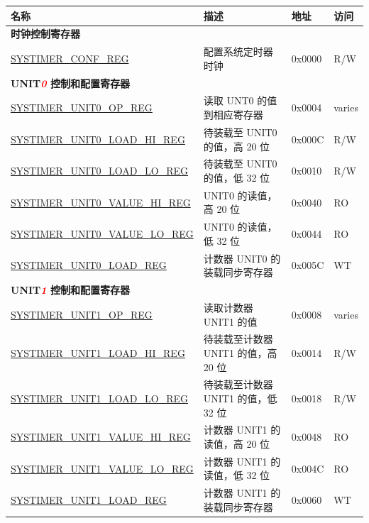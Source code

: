 \begin{longtable}{ | p{6cm} | p{7.2cm} | p{1.3cm} | p{1cm} | }
\hline\rowcolor{lightgray}
名称 & 描述 & 地址 & 访问 \\ \hline
\endhead
\multicolumn{4}{|l|}{\textbf{时钟控制寄存器}} \\ \hline
\hyperref[regdesc:SYSTIMERCONFREG]{SYSTIMER\_CONF\_REG} & 配置系统定时器时钟 & 0x0000 & R/W \\ \hline
\multicolumn{4}{|l|}{\textbf{UNIT\textcolor{red}{\it{0}} 控制和配置寄存器}} \\ \hline
\hyperref[regdesc:SYSTIMERUNIT0OPREG]{SYSTIMER\_UNIT0\_OP\_REG} & 读取 UNT0 的值到相应寄存器 & 0x0004 & varies \\ \hline
\hyperref[regdesc:SYSTIMERUNIT0LOADHIREG]{SYSTIMER\_UNIT0\_LOAD\_HI\_REG} & 待装载至 UNIT0 的值，高 20 位 & 0x000C & R/W \\ \hline
\hyperref[regdesc:SYSTIMERUNIT0LOADLOREG]{SYSTIMER\_UNIT0\_LOAD\_LO\_REG} & 待装载至 UNIT0 的值，低 32 位 & 0x0010 & R/W \\ \hline
\hyperref[regdesc:SYSTIMERUNIT0VALUEHIREG]{SYSTIMER\_UNIT0\_VALUE\_HI\_REG} & UNIT0 的读值，高 20 位 & 0x0040 & RO \\ \hline
\hyperref[regdesc:SYSTIMERUNIT0VALUELOREG]{SYSTIMER\_UNIT0\_VALUE\_LO\_REG} & UNIT0 的读值，低 32 位 & 0x0044 & RO \\ \hline
\hyperref[regdesc:SYSTIMERUNIT0LOADREG]{SYSTIMER\_UNIT0\_LOAD\_REG} & 计数器 UNIT0 的装载同步寄存器 & 0x005C & WT \\ \hline
\multicolumn{4}{|l|}{\textbf{UNIT\textcolor{red}{\it{1}} 控制和配置寄存器}} \\ \hline
\hyperref[regdesc:SYSTIMERUNIT1OPREG]{SYSTIMER\_UNIT1\_OP\_REG} & 读取计数器 UNIT1 的值 & 0x0008 & varies \\ \hline
\hyperref[regdesc:SYSTIMERUNIT1LOADHIREG]{SYSTIMER\_UNIT1\_LOAD\_HI\_REG} & 待装载至计数器 UNIT1 的值，高 20 位 & 0x0014 & R/W \\ \hline
\hyperref[regdesc:SYSTIMERUNIT1LOADLOREG]{SYSTIMER\_UNIT1\_LOAD\_LO\_REG} & 待装载至计数器 UNIT1 的值，低 32 位 & 0x0018 & R/W \\ \hline
\hyperref[regdesc:SYSTIMERUNIT1VALUEHIREG]{SYSTIMER\_UNIT1\_VALUE\_HI\_REG} & 计数器 UNIT1 的读值，高 20 位 & 0x0048 & RO \\ \hline
\hyperref[regdesc:SYSTIMERUNIT1VALUELOREG]{SYSTIMER\_UNIT1\_VALUE\_LO\_REG} & 计数器 UNIT1 的读值，低 32 位 & 0x004C & RO \\ \hline
\hyperref[regdesc:SYSTIMERUNIT1LOADREG]{SYSTIMER\_UNIT1\_LOAD\_REG} & 计数器 UNIT1 的装载同步寄存器 & 0x0060 & WT \\ \hline

\end{longtable}
